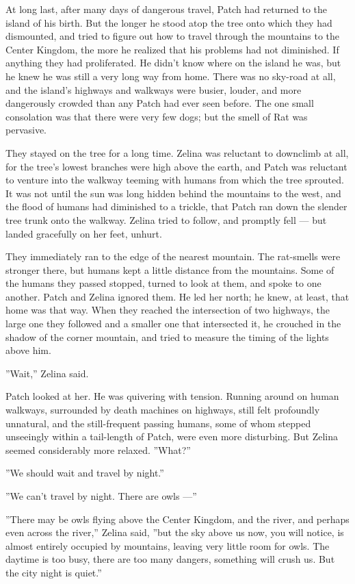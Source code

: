 \documentclass[12pt]{book}
\begin{document}
At long last, after many days of dangerous travel, Patch had returned
to the island of his birth. But the longer he stood atop the tree onto
which they had dismounted, and tried to figure out how to travel
through the mountains to the Center Kingdom, the more he realized that
his problems had not diminished. If anything they had proliferated. He
didn't know where on the island he was, but he knew he was still a
very long way from home. There was no sky-road at all, and the
island's highways and walkways were busier, louder, and more
dangerously crowded than any Patch had ever seen before. The one small
consolation was that there were very few dogs; but the smell of Rat
was pervasive.

They stayed on the tree for a long time. Zelina was reluctant to
downclimb at all, for the tree's lowest branches were high above the
earth, and Patch was reluctant to venture into the walkway teeming
with humans from which the tree sprouted. It was not until the sun was
long hidden behind the mountains to the west, and the flood of humans
had diminished to a trickle, that Patch ran down the slender tree
trunk onto the walkway. Zelina tried to follow, and promptly fell ---
but landed gracefully on her feet, unhurt.

They immediately ran to the edge of the nearest mountain. The
rat-smells were stronger there, but humans kept a little distance from
the mountains. Some of the humans they passed stopped, turned to look
at them, and spoke to one another. Patch and Zelina ignored them. He
led her north; he knew, at least, that home was that way. When they
reached the intersection of two highways, the large one they followed
and a smaller one that intersected it, he crouched in the shadow of
the corner mountain, and tried to measure the timing of the lights
above him.

''Wait,'' Zelina said.

Patch looked at her. He was quivering with tension. Running around on
human walkways, surrounded by death machines on highways, still felt
profoundly unnatural, and the still-frequent passing humans, some of
whom stepped unseeingly within a tail-length of Patch, were even more
disturbing. But Zelina seemed considerably more relaxed. ''What?''

''We should wait and travel by night.''

''We can't travel by night. There are owls ---''

''There may be owls flying above the Center Kingdom, and the river,
and perhaps even across the river,'' Zelina said, ''but the sky above
us now, you will notice, is almost entirely occupied by mountains,
leaving very little room for owls. The daytime is too busy, there are
too many dangers, something will crush us. But the city night is
quiet.''
\end{document}
